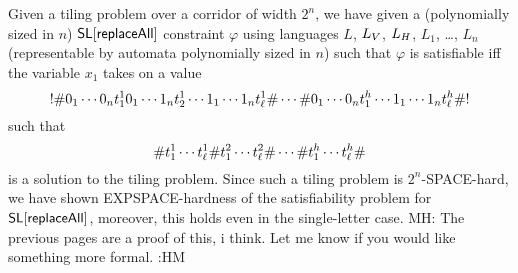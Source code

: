 \documentclass{article}
\newcommand{\mat}[1]{\color{cyan} {MH: #1 :HM} \color{black}}
\begin{document}
Given a tiling problem over a corridor of width $2^n$, we have given a (polynomially sized in $n$)
$\strline[\replaceall]$
constraint $\varphi$ using languages
$L$, $L_\vcons$, $L_\hcons$, $L_1$, \ldots, $L_n$
(representable by automata polynomially sized in $n$)
such that $\varphi$ is satisfiable iff the variable $x_1$ takes on a value
\[
    \resetchar
    \rowdelim \nbit{1}{0} \cdots \nbit{n}{0} \tile^1_1
              \nbit{1}{0} \cdots \nbit{n}{1} \tile^1_2
              \cdots
              \nbit{1}{1} \cdots \nbit{n}{1} \tile^1_\width
    \rowdelim \cdots
    \rowdelim \nbit{1}{0} \cdots \nbit{n}{0} \tile^\height_1
              \cdots
              \nbit{1}{1} \cdots \nbit{n}{1} \tile^\height_\width
    \rowdelim
    \resetchar
\]
such that
\[
    \rowdelim \tile^1_1 \cdots \tile^1_\width
    \rowdelim \tile^2_1 \cdots \tile^2_\width
    \rowdelim \cdots
    \rowdelim \tile^\height_1 \cdots \tile^\height_\width
    \rowdelim
\]
is a solution to the tiling problem.
Since such a tiling problem is $2^n$-SPACE-hard, we have shown EXPSPACE-hardness of
the satisfiability problem for $\strline[\replaceall]$, moreover, this holds even in the single-letter case.
\mat{
    The previous pages are a proof of this, i think.
    Let me know if you would like something more formal.
}
\end{document}
